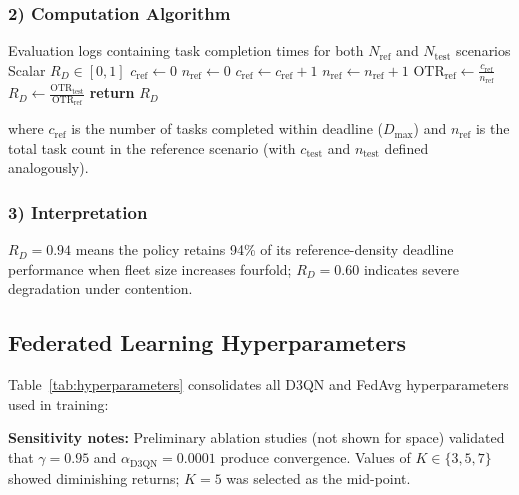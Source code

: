 \subsubsection*{2) Computation Algorithm}

\begin{algorithm}
\caption{Deadline Retention Ratio Computation}
\label{alg:drr}
\begin{algorithmic}[1]
\REQUIRE Evaluation logs containing task completion times for both $N_{\text{ref}}$ and $N_{\text{test}}$ scenarios
\ENSURE Scalar $R_D \in [0, 1]$
\STATE $c_{\text{ref}} \gets 0$
\STATE $n_{\text{ref}} \gets 0$
    \STATE $c_{\text{ref}} \gets c_{\text{ref}} + 1$
  \ENDIF
  \STATE $n_{\text{ref}} \gets n_{\text{ref}} + 1$
\ENDFOR
\STATE $\text{OTR}_{\text{ref}} \gets \frac{c_{\text{ref}}}{n_{\text{ref}}}$
\STATE $R_D \gets \frac{\text{OTR}_{\text{test}}}{\text{OTR}_{\text{ref}}}$
\STATE \textbf{return} $R_D$
\end{algorithmic}
\end{algorithm}

\noindent where $c_{\text{ref}}$ is the number of tasks completed within deadline ($D_{\max}$) and $n_{\text{ref}}$ is the total task count in the reference scenario (with $c_{\text{test}}$ and $n_{\text{test}}$ defined analogously).

\subsubsection*{3) Interpretation}
$R_D = 0.94$ means the policy retains 94\% of its reference-density deadline performance when fleet size increases fourfold; $R_D = 0.60$ indicates severe degradation under contention.

\subsection{Federated Learning Hyperparameters}

Table~\ref{tab:hyperparameters} consolidates all D3QN and FedAvg hyperparameters used in training:



\textbf{Sensitivity notes:} Preliminary ablation studies (not shown for space) validated that $\gamma = 0.95$ and $\alpha_{\text{D3QN}} = 0.0001$ produce convergence. Values of $K \in \{3, 5, 7\}$ showed diminishing returns; $K = 5$ was selected as the mid-point.

